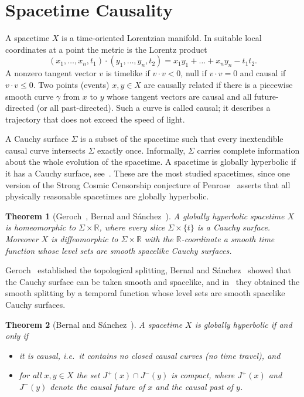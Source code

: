 \documentclass[11pt]{article}
\newtheorem{theorem}{Theorem}[section]
\theoremstyle{definition}
\newcommand{\R}{\mathbb{R}}
\begin{document}
\section{Spacetime Causality}\label{sec:causality}

A spacetime $X$ is a time-oriented Lorentzian manifold. In suitable local coordinates at a point the
metric is the Lorentz product
\[
(x_1,\dots,x_n,t_1)\cdot(y_1,\dots,y_n,t_2)=x_1y_1+\dots+x_ny_n-t_1t_2 .
\]
A nonzero tangent vector $v$ is timelike if $v\cdot v<0$, null if $v\cdot v=0$ and causal if
$v\cdot v\le0$. Two points (events) $x,y\in X$ are causally related if there is a piecewise smooth
curve $\gamma$ from $x$ to $y$ whose tangent vectors are causal and all future-directed (or all
past-directed). Such a curve is called causal; it describes a trajectory that does not exceed the speed
of light.

A Cauchy surface $\Sigma$ is a subset of the spacetime such that every inextendible causal curve
intersects $\Sigma$ exactly once. Informally, $\Sigma$ carries complete information about the whole
evolution of the spacetime. A spacetime is globally hyperbolic if it has a Cauchy surface,
see~\cite{HE73}. These are the most studied spacetimes, since one version of the Strong Cosmic
Censorship conjecture of Penrose~\cite{Pen98} asserts that all physically reasonable spacetimes are
globally hyperbolic.

\begin{theorem}[Geroch~\cite{Ger70}, Bernal and S\'anchez~\cite{BS03,BS05}]
A globally hyperbolic spacetime $X$ is homeomorphic to $\Sigma\times\R$, where every slice
$\Sigma\times\{t\}$ is a Cauchy surface. Moreover $X$ is diffeomorphic to $\Sigma\times\R$ with the
$\R$-coordinate a smooth time function whose level sets are smooth spacelike Cauchy surfaces.
\end{theorem}

Geroch~\cite{Ger70} established the topological splitting, Bernal and S\'anchez~\cite{BS03}
showed that the Cauchy surface can be taken smooth and spacelike, and in~\cite{BS05} they obtained the
smooth splitting by a temporal function whose level sets are smooth spacelike Cauchy surfaces.

\begin{theorem}[Bernal and S\'anchez~\cite{BS07}]
A spacetime $X$ is globally hyperbolic if and only if
\begin{itemize}
\item it is causal, i.e.\ it contains no closed causal curves (no time travel), and
\item for all $x,y\in X$ the set $J^+(x)\cap J^-(y)$ is compact, where $J^+(x)$ and $J^-(y)$ denote
the causal future of $x$ and the causal past of $y$.
\end{itemize}
\end{theorem}
\end{document}
